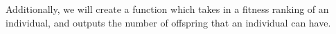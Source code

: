 \ms
\nid Additionally, we will create a function which takes in a fitness ranking of an individual, and outputs the number of offspring that an individual can have.




















































































































